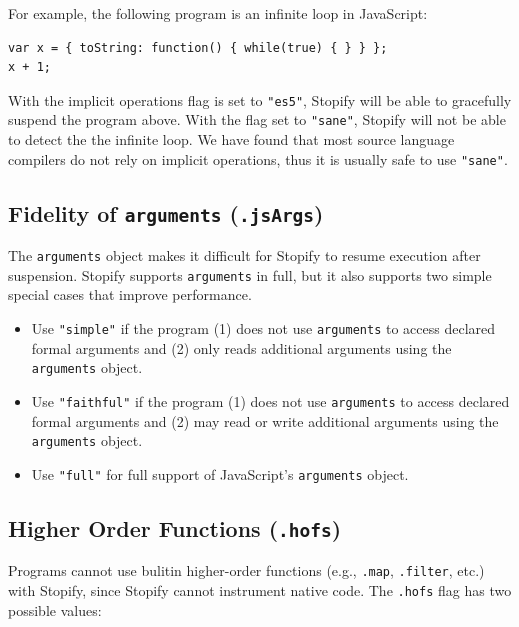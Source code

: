 \documentclass[10pt]{book}
\begin{document}
For example, the following program is an infinite loop in JavaScript:

\begin{lstlisting}
var x = { toString: function() { while(true) { } } };
x + 1;
\end{lstlisting}

With the implicit operations flag is set to \lstinline|"es5"|, Stopify will be
able to gracefully suspend the program above. With the flag set to \lstinline|"sane"|,
Stopify will not be able to detect the the infinite loop. We have found that
most source language compilers do not rely on implicit operations, thus it is
usually safe to use \lstinline|"sane"|.

\subsection{Fidelity of \texttt{arguments} (\texttt{.jsArgs})\label{arguments-flag}}

The \lstinline|arguments| object makes it difficult for Stopify to resume
execution after suspension. Stopify supports \lstinline|arguments| in full, but
it also supports two simple special cases that improve performance.

\begin{itemize}

  \item Use \lstinline|"simple"| if the program (1) does not use \lstinline|arguments| to
    access declared formal arguments and (2) only reads additional
    arguments using the \lstinline|arguments| object.

  \item Use \lstinline|"faithful"| if the program (1) does not use \lstinline|arguments|
    to access declared formal arguments and (2) may read or write additional
    arguments using the \lstinline|arguments| object.

  \item Use \lstinline|"full"| for full support of JavaScript's \lstinline|arguments| object.

\end{itemize}

\subsection{Higher Order Functions (\texttt{.hofs}) \label{hofs-flag}}

Programs cannot use bulitin higher-order functions (e.g., \lstinline|.map|,
\lstinline|.filter|, etc.) with Stopify, since Stopify cannot instrument native
code. The \lstinline|.hofs| flag has two possible values:
\end{document}
